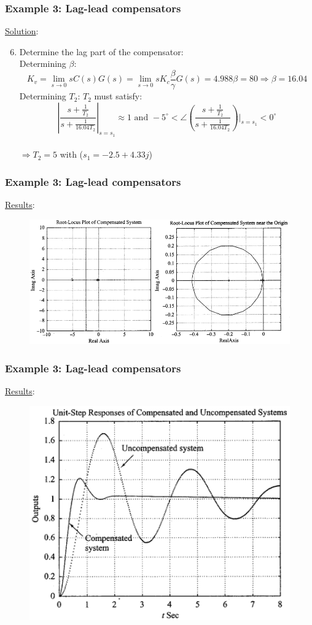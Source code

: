 \begin{frame}
	\frametitle{Example 3: Lag-lead compensators}
	\underline{Solution}:
	\begin{enumerate}
		\setcounter{enumi}{5}
		\item Determine the lag part of the compensator:\\
		Determining $\beta$:
		$$K_v=\lim_{s \to 0}sC(s)G(s)=\lim_{s\to0}sK_c\frac{\beta}{\gamma}G(s)=4.988\beta=80 \Rightarrow \beta=16.04$$
		Determining $T_2$: $T_2$ must satisfy:
		$$|\frac{s+\frac{1}{T_2}}{s+\frac{1}{16.04T_2}}|_{s=s_1}\approx1 \text{ and } -5^{\circ}<\angle(\frac{s+\frac{1}{T_2}}{s+\frac{1}{16.04T_2}})|_{s=s_1}<0^{\circ}$$\\
		 $\Rightarrow T_2=5$ with ($s_1=-2.5+4.33j$)
	\end{enumerate}
\end{frame}

\begin{frame}
	\frametitle{Example 3: Lag-lead compensators}
	\underline{Results}:\\
	\begin{figure}
		\centering
		\includegraphics[width=1\linewidth]{Ex3_rootlocus}
	\end{figure}
\end{frame}

\begin{frame}
	\frametitle{Example 3: Lag-lead compensators}
	\underline{Results}:\\
	\begin{figure}
		\centering
		\includegraphics[width=0.65\linewidth]{Ex3_response}
	\end{figure}
\end{frame}

